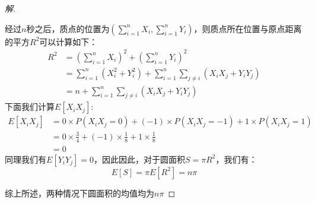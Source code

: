 \documentclass[12pt]{article}
\begin{document}
\begin{enumerate}
\begin{proof}[解]
\begin{enumerate}[1)]
		经过$n$秒之后，质点的位置为$\left(\sum_{i=1}^nX_i,\sum_{i=1}^nY_i\right)$，则质点所在位置与原点距离的平方$R^2$可以计算如下：
		\begin{equation}
		\begin{aligned}
		R^2&=\left(\sum_{i=1}^nX_i\right)^2+\left(\sum_{i=1}^nY_i\right)^2 \\
		&=\sum_{i=1}^n\left(X_i^2+Y_i^2\right)+\sum_{i=1}^n\sum_{j\ne i}\left(X_iX_j+Y_iY_j\right) \\
		&=n+\sum_{i=1}^n\sum_{j\ne i}\left(X_iX_j+Y_iY_j\right)
		\end{aligned}
		\end{equation}
		下面我们计算$E[X_iX_j]$:
		\begin{equation}
		\begin{aligned}
		E[X_iX_j]&=0\times P(X_iX_j=0)+(-1)\times P(X_iX_j=-1)+1\times P(X_iX_j=1) \\
		&=0\times\frac{3}{4}+(-1)\times\frac{1}{8}+1\times\frac{1}{8} \\
		&=0
		\end{aligned}
		\end{equation}
		同理我们有$E[Y_iY_j]=0$，因此因此，对于圆面积$S=\pi R^2$，我们有：
		\begin{equation}
		E[S]=\pi E[R^2]=n\pi
		\end{equation}
	\end{enumerate}
	综上所述，两种情况下圆面积的均值均为$n\pi$
\end{proof}


\end{enumerate}
\end{document}
